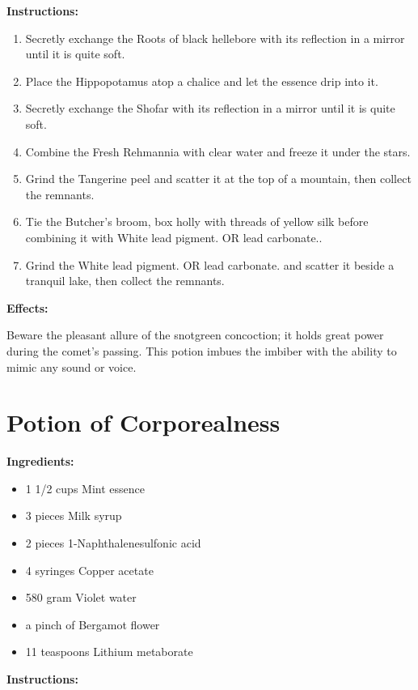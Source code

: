 \documentclass{article}
\begin{document}
\textbf{Instructions:}

\begin{enumerate}
  \item Secretly exchange the Roots of black hellebore with its reflection in a mirror until it is quite soft.
  \item Place the Hippopotamus atop a chalice and let the essence drip into it.
  \item Secretly exchange the Shofar with its reflection in a mirror until it is quite soft.
  \item Combine the Fresh Rehmannia with clear water and freeze it under the stars.
  \item Grind the Tangerine peel and scatter it at the top of a mountain, then collect the remnants.
  \item Tie the Butcher's broom, box holly with threads of yellow silk before combining it with White lead pigment. OR lead carbonate..
  \item Grind the White lead pigment. OR lead carbonate. and scatter it beside a tranquil lake, then collect the remnants.
\end{enumerate}

\textbf{Effects:}

Beware the pleasant allure of the snotgreen concoction; it holds great power during the comet’s passing. This potion imbues the imbiber with the ability to mimic any sound or voice.

\newpage
\section*{Potion of Corporealness}

\textbf{Ingredients:}

\begin{itemize}
  \item 1 1/2 cups Mint essence
  \item 3 pieces Milk syrup
  \item 2 pieces 1-Naphthalenesulfonic acid
  \item 4 syringes Copper acetate
  \item 580 gram Violet water
  \item a pinch of Bergamot flower
  \item 11 teaspoons Lithium metaborate
\end{itemize}

\textbf{Instructions:}
\end{document}
